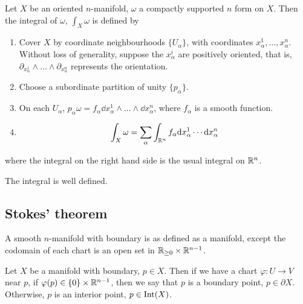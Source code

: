 \begin{definition}
    [integral] Let \(X\) be an oriented \(n\)-manifold, \(\omega\) a compactly supported \(n\) form on \(X\). Then the integral of \(\omega\), \(\int_X\omega\) is defined by

    \begin{enumerate}
        \item Cover \(X\) by coordinate neighbourhoods \(\{U_\alpha\}\), with coordinates \(x_\alpha^1, \dots, x_\alpha^n\). Without loss of generality, suppose the \(x_\alpha^i\) are positively oriented, that is, \(\partial_{x_\alpha^1} \wedge \dots \wedge \partial_{x_\alpha^n}\) represents the orientation.
        \item Choose a subordinate partition of unity \(\{p_\alpha\}\).
        \item On each \(U_\alpha\), \(p_\alpha\omega = f_\alpha \dd x_\alpha^1 \wedge \dots \wedge \dd x_\alpha^n\), where \(f_\alpha\) is a smooth function.
        \item \[\int_X\omega = \sum_\alpha \int_{\mathbb{R}^n}f_\alpha \dd x_\alpha^1\cdots\dd x_\alpha^n\]
    \end{enumerate}

    where the integral on the right hand side is the usual integral on \(\mathbb{R}^n\).
\end{definition}

\begin{lemma}
    The integral is well defined.
\end{lemma}

\subsection{Stokes' theorem}

\begin{definition}
     A smooth \(n\)-manifold with boundary is as defined as a manifold, except the codomain of each chart is an open set in \(\mathbb{R}_{\ge 0} \times \mathbb{R}^{n-1}\).
\end{definition}

\begin{definition}
     Let \(X\) be a manifold with boundary, \(p \in X\). Then if we have a chart \(\varphi : U \to V\) near \(p\), if \(\varphi(p) \in \{0\} \times \mathbb{R}^{n-1}\), then we say that \(p\) is a boundary point, \(p \in \partial X\). Otherwise, \(p\) is an interior point, \(p \in \operatorname{Int}(X)\).
\end{definition}

